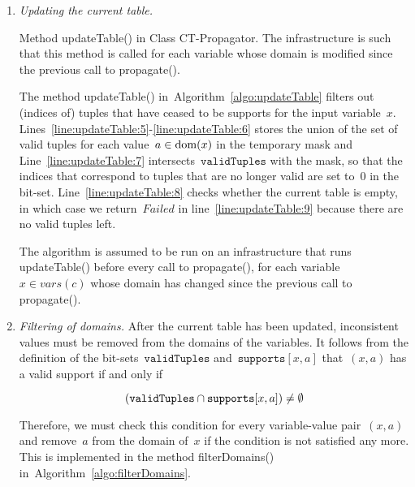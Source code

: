 \documentclass[a4paper,11pt]{article}
\newcommand{\Algoref}[1]{Algorithm~\ref{#1}}
\newcommand{\Lineref}[1]{Line~\ref{#1}}
\newcommand{\Linesref}[2]{Lines~\ref{#1}-\ref{#2}}
\newcommand{\CurrTable}{\texttt{validTuples}}
\newcommand{\Supports}{\texttt{supports}}
\numberwithin{equation}{section}
\begin{document}
\begin{enumerate}
\item \textit{Updating the current table.} 
  
  \begin{algorithm}[H]
  \begin{algorithmic}[1]  %
    
  \end{algorithmic}
  \caption{Method updateTable() in Class CT-Propagator. The infrastructure
  is such that this method is called for each variable whose domain is
  modified since the previous call to propagate().}
  \label{algo:updateTable}
\end{algorithm}

  The method updateTable() in~\Algoref{algo:updateTable}
  filters out (indices of)
  tuples that have ceased to be supports for the input variable~$x$.
  \Linesref{line:updateTable:5}{line:updateTable:6} stores the union of the
  set of valid tuples for each value~$a \in \text{dom}(x)$ in the temporary mask
  and \Lineref{line:updateTable:7} intersects~$\CurrTable$ with the mask,
  so that the indices that correspond to tuples that are no longer valid
  are set to~$0$ in the bit-set.
  \Lineref{line:updateTable:8} checks whether the current table is empty,
  in which case we return~$Failed$ in line~\ref{line:updateTable:9}
  because there are no valid tuples left. 

  The algorithm is assumed to be run on an infrastructure that runs updateTable()
  before every call to propagate(),
  for each variable~$x \in vars(c)$ whose domain has changed since the previous call to
  propagate().

\item 
  \textit{Filtering of domains.}
  After the current table has been updated, inconsistent values must be removed
  from the domains of the variables.   
  It follows from the definition of the bit-sets~$\CurrTable$ and~$\Supports[x,a]$
  that~$(x,a)$ has a valid support if and only if 

  \begin{equation}
    \label{eq:validcond}
    (\CurrTable \Inter \Supports[x,a]) \neq \emptyset
  \end{equation}

  Therefore, we must check this condition for every variable-value pair~$(x,a)$ and
  remove~$a$ from the domain of~$x$ if the condition is not satisfied any more.
  This is implemented in the method filterDomains()
  in~\Algoref{algo:filterDomains}.%


\end{enumerate}
\end{document}
